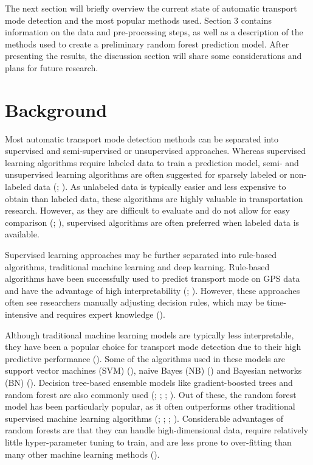 \documentclass[10pt, a4paper, titlepage, hidelinks]{article}
\begin{document}
The next section will briefly overview the current state of automatic transport mode detection and the most popular methods used. Section 3 contains information on the data and pre-processing steps, as well as a description of the methods used to create a preliminary random forest prediction model. After presenting the results, the discussion section will share some considerations and plans for future research.

\section{Background}

Most automatic transport mode detection methods can be separated into supervised and semi-supervised or unsupervised approaches. Whereas supervised learning algorithms require labeled data to train a prediction model, semi- and unsupervised learning algorithms are often suggested for sparsely labeled or non-labeled data (\cite{sadeghian2021}; \cite{yang2024}). As unlabeled data is typically easier and less expensive to obtain than labeled data, these algorithms are highly valuable in transportation research. However, as they are difficult to evaluate and do not allow for easy comparison (\cite{li2022}; \cite{markas&yu2020}), supervised algorithms are often preferred when labeled data is available.

Supervised learning approaches may be further separated into rule-based algorithms, traditional machine learning and deep learning. Rule-based algorithms have been successfully used to predict transport mode on GPS data and have the advantage of high interpretability (\cite{sadeghian2021}; \cite{xiao2019}). However, these approaches often see researchers manually adjusting decision rules, which may be time-intensive and requires expert knowledge (\cite{sadeghian2021}).

Although traditional machine learning models are typically less interpretable, they have been a popular choice for transport mode detection due to their high predictive performance (\cite{yang2024}). Some of the algorithms used in these models are support vector machines (SVM) (\cite{bolbol2012}), naive Bayes (NB) (\cite{nour2016}) and Bayesian networks (BN) (\cite{xiao2015}). Decision tree-based ensemble models like gradient-boosted trees and random forest are also commonly used (\cite{li2021}; \cite{lu2019}; \cite{shafique2016}; \cite{liu2022}). Out of these, the random forest model has been particularly popular, as it often outperforms other traditional supervised machine learning algorithms (\cite{bedogni2016}; \cite{bjerre-nielsen2020}; \cite{hasan2022}; \cite{sadeghian2022}). Considerable advantages of random forests are that they can handle high-dimensional data, require relatively little hyper-parameter tuning to train, and are less prone to over-fitting than many other machine learning methods (\cite{pappu2014}).
\end{document}

